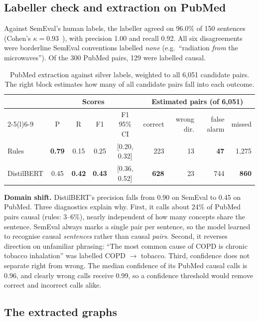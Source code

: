 \documentclass[11pt,a4paper]{article}
\begin{document}
\subsection{Labeller check and extraction on PubMed}

Against SemEval's human labels, the labeller agreed on 96.0\% of 150 sentences (Cohen's $\kappa = 0.93$~\citep{cohen1960}), with precision
1.00 and recall 0.92. All six disagreements were borderline SemEval conventions labelled \textit{none} (e.g.\ ``radiation \emph{from}
the microwaves''). Of the 300 PubMed pairs, 129 were labelled causal.

\begin{table}[H]
\centering\small
\begin{tabular}{@{}lccccrrrr@{}}
\toprule
 & \multicolumn{4}{c}{Scores} & \multicolumn{4}{c}{Estimated pairs (of 6{,}051)} \\
\cmidrule(lr){2-5}\cmidrule(l){6-9}
 & P & R & F1 & F1 95\% CI & correct & wrong dir. & false alarm & missed \\
\midrule
Rules & \textbf{0.79} & 0.15 & 0.25 & [0.20, 0.32] & 223 & 13 & \textbf{47} & 1{,}275 \\
DistilBERT & 0.45 & \textbf{0.42} & \textbf{0.43} & [0.36, 0.52] & \textbf{628} & 23 & 744 & \textbf{860} \\
\bottomrule
\end{tabular}
\caption{PubMed extraction against silver labels, weighted to all 6{,}051 candidate pairs. The right block estimates how many of all candidate pairs fall into each outcome.}
\label{tab:pubmed}
\end{table}

\textbf{Domain shift.} DistilBERT's precision falls from 0.90 on SemEval to 0.45 on PubMed. Three diagnostics explain why. First, it
calls about 24\% of PubMed pairs causal (rules: 3--6\%), nearly independent of how many concepts share the sentence. SemEval always
marks a single pair per sentence, so the model learned to recognise causal \emph{sentences} rather than causal \emph{pairs}. Second, it
reverses direction on unfamiliar phrasing: ``The most common cause of COPD is chronic tobacco inhalation'' was labelled COPD
$\rightarrow$ tobacco. Third, confidence does not separate right from wrong. The median confidence of its PubMed causal calls is 0.96,
and clearly wrong calls receive 0.99, so a confidence threshold would remove correct and incorrect calls alike.

\subsection{The extracted graphs}
\end{document}
